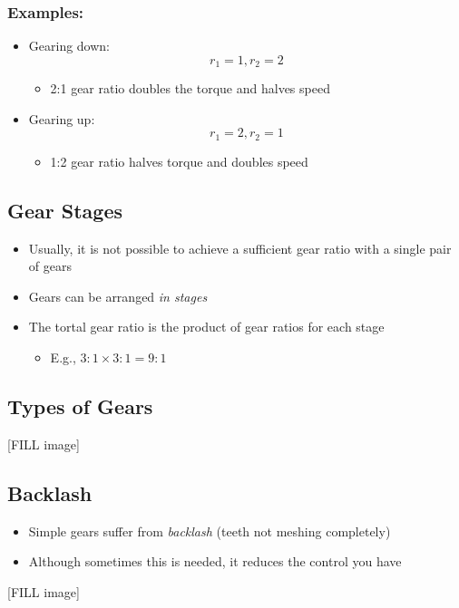 \documentclass[10pt]{article}
\begin{document}
\subsubsection*{Examples:}
\begin{itemize}
	\item Gearing down:
	\[r_1 = 1, r_2 = 2\]
    \begin{itemize}
        \item 2:1 gear ratio doubles the torque and halves speed
    \end{itemize}    
    \item Gearing up:
    \[r_1 = 2, r_2 = 1\]
    \begin{itemize}
        \item 1:2 gear ratio halves torque and doubles speed
    \end{itemize}
\end{itemize}

\subsection*{Gear Stages}
\begin{itemize}
	\item Usually, it is not possible to achieve a sufficient gear ratio with a single pair of gears
	\item Gears can be arranged \textit{in stages}
	\item The tortal gear ratio is the product of gear ratios for each stage
	\begin{itemize}
        \item E.g., $3:1 \times 3:1 = 9:1$
    \end{itemize}
\end{itemize}

\subsection*{Types of Gears}
[FILL image]

\subsection*{Backlash}
\begin{itemize}
	\item Simple gears suffer from \textit{backlash} (teeth not meshing completely)
	\item Although sometimes this is needed, it reduces the control you have
\end{itemize}
[FILL image]
\end{document}

